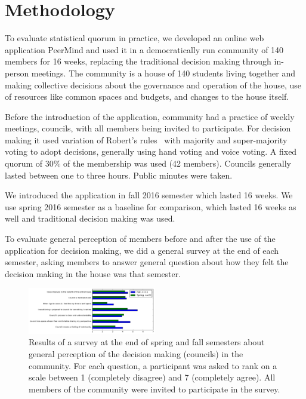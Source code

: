 \documentclass[chi_draft]{sigchi}
\begin{document}
\section{Methodology}
\label{sec:methodology}

To evaluate statistical quorum in practice, we developed an online web application PeerMind and
used it in a democratically run community of 140 members for 16 weeks, replacing the traditional
decision making through in-person meetings. The community is a house of 140
students living together and making collective decisions about the governance and operation of
the house, use of resources like common spaces and budgets, and changes to the house itself.

Before the introduction of the application, community had a practice of weekly meetings, councils, with all
members being invited to participate. For decision making it used variation of Robert's rules~\cite{roberts}
with majority and super-majority voting to adopt decisions, generally using hand voting and voice voting.
A fixed quorum of $30\%$ of the membership was used (42 members). Councils generally lasted between one to three hours.
Public minutes were taken.

We introduced the application in fall 2016 semester which lasted 16 weeks. We use spring 2016 semester as
a baseline for comparison, which lasted 16 weeks as well and traditional decision making was used.

To evaluate general perception of members before and after the use of the application for decision making,
we did a general survey at the end of each semester, asking members to answer general question about how
they felt the decision making in the house was that semester.




\begin{figure}[ht]
\centering
\includegraphics[width=0.5\textwidth]{figures/survey-comparison.pdf}
\caption{Results of a survey at the end of spring and fall semesters about general perception of the decision making (councils) in the community.
For each question, a participant was asked to rank on a scale between 1 (completely disagree) and 7 (completely agree). All members
of the community were invited to participate in the survey.}
\label{fig:survey-comparison}
\end{figure}
\end{document}
